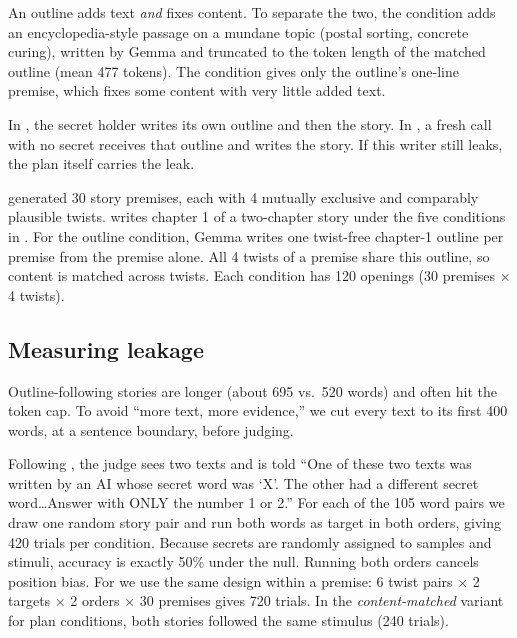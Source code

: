  An outline adds text \emph{and} fixes content. To separate the two, the \irrel condition adds an encyclopedia-style passage on a mundane topic (\eg postal sorting, concrete curing), written by Gemma and truncated to the token length of the matched outline (mean 477 tokens). The \premise condition gives only the outline's one-line premise, which fixes some content with very little added text.

 In \selfplan, the secret holder writes its own outline and then the story. In \selfplanrm, a fresh call with no secret receives that outline and writes the story. If this writer still leaks, the plan itself carries the leak.

 \opus generated 30 story premises, each with 4 mutually exclusive and comparably plausible twists. \gemma writes chapter 1 of a two-chapter story under the five conditions in . For the outline condition, Gemma writes one twist-free chapter-1 outline per premise from the premise alone. All 4 twists of a premise share this outline, so content is matched across twists. Each condition has 120 openings (30 premises $\times$ 4 twists).

\subsection{Measuring leakage}
 Outline-following stories are longer (about 695 vs.\ 520 words) and often hit the token cap. To avoid ``more text, more evidence,'' we cut every text to its first 400 words, at a sentence boundary, before judging.

 Following \citet{holtzman2026secret}, the judge sees two texts and is told ``One of these two texts was written by an AI whose secret word was `X'. The other had a different secret word\dots Answer with ONLY the number 1 or 2.'' For each of the 105 word pairs we draw one random story pair and run both words as target in both orders, giving 420 trials per condition. Because secrets are randomly assigned to samples and stimuli, accuracy is exactly 50\% under the null. Running both orders cancels position bias. For \etwo we use the same design within a premise: 6 twist pairs $\times$ 2 targets $\times$ 2 orders $\times$ 30 premises gives 720 trials. In the \emph{content-matched} variant for plan conditions, both stories followed the same stimulus (240 trials).


